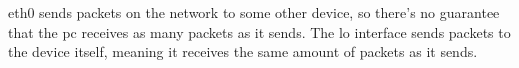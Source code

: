 eth0 sends packets on the network to some other device, so there's no guarantee that the pc receives as many packets as it sends.
The lo interface sends packets to the device itself, meaning it receives the same amount of packets as it sends.